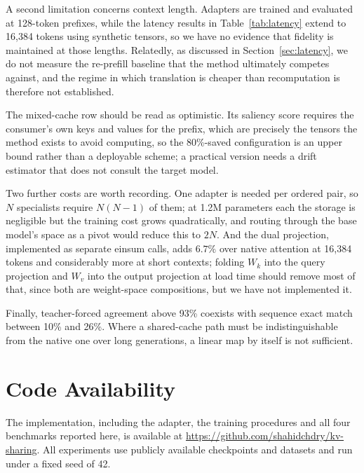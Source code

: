 \documentclass[11pt]{article}
\begin{document}
A second limitation concerns context length. Adapters are trained and evaluated at 128-token
prefixes, while the latency results in Table~\ref{tab:latency} extend to 16{,}384 tokens
using synthetic tensors, so we have no evidence that fidelity is maintained at those
lengths. Relatedly, as discussed in Section~\ref{sec:latency}, we do not measure the
re-prefill baseline that the method ultimately competes against, and the regime in which
translation is cheaper than recomputation is therefore not established.

The mixed-cache row should be read as optimistic. Its saliency score requires the consumer's
own keys and values for the prefix, which are precisely the tensors the method exists to
avoid computing, so the 80\%-saved configuration is an upper bound rather than a deployable
scheme; a practical version needs a drift estimator that does not consult the target model.

Two further costs are worth recording. One adapter is needed per ordered pair, so $N$
specialists require $N(N-1)$ of them; at 1.2M parameters each the storage is negligible but
the training cost grows quadratically, and routing through the base model's space as a pivot
would reduce this to $2N$. And the dual projection, implemented as separate einsum calls,
adds $6.7\%$ over native attention at 16{,}384 tokens and considerably more at short
contexts; folding $W_k$ into the query projection and $W_v$ into the output projection at
load time should remove most of that, since both are weight-space compositions, but we have
not implemented it.

Finally, teacher-forced agreement above 93\% coexists with sequence exact match between
10\% and 26\%. Where a shared-cache path must be indistinguishable from the native one over
long generations, a linear map by itself is not sufficient.

\section*{Code Availability}

The implementation, including the adapter, the training procedures and all four benchmarks
reported here, is available at \url{https://github.com/shahidchdry/kv-sharing}. All
experiments use publicly available checkpoints and datasets and run under a fixed seed
of 42.
\end{document}

